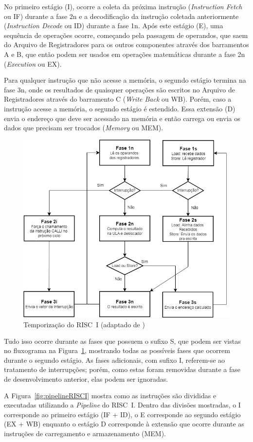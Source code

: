 \documentclass[
	12pt,				%
	openright,			%
	oneside,			%
	a4paper,			%
	english,			%
	french,				%
	spanish,			%
	brazil,				%
	]{abntex2}
\begin{document}
No primeiro estágio (I), ocorre a coleta da próxima instrução (\textit{Instruction Fetch} ou IF) durante a fase 2n e a decodificação da instrução coletada anteriormente (\textit{Instruction Decode} ou ID) durante a fase 1n. Após este estágio (E), uma sequência de operações ocorre, começando pela passagem de operandos, que saem do Arquivo de Registradores para os outros componentes através dos barramentos A e B, que então podem ser usados em operações matemáticas durante a fase 2n (\textit{Execution} ou EX).

Para qualquer instrução que não acesse a memória, o segundo estágio termina na fase 3n, onde os resultados de quaisquer operações são escritos no Arquivo de Registradores através do barramento C (\textit{Write Back} ou WB). Porém, caso a instrução acesse a memória, o segundo estágio é estendido. Essa extensão (D) envia o endereço que deve ser acessado na memória e então carrega ou envia os dados que precisam ser trocados (\textit{Memory} ou MEM).

\begin{figure}[h]
    \centering
    \includegraphics[width=0.5\linewidth]{ProcessoDesenvolvimento/Arquitetura/temporizacao_RISC-I.png}
    \caption{Temporização do RISC~I (adaptado de )}
    \label{fig:temporizationDiagram}
\end{figure}

Tudo isso ocorre durante as fases que possuem o sufixo S, que podem ser vistas no fluxograma na Figura~\ref{fig:temporizationDiagram}, mostrando todas as possíveis fases que ocorrem durante o segundo estágio. As fases adicionais, com sufixo I, referem-se ao tratamento de interrupções; porém, como estas foram removidas durante a fase de desenvolvimento anterior, elas podem ser ignoradas.

A Figura~\ref{fig:pipelineRISCI} mostra como as instruções são divididas e executadas utilizando a \textit{Pipeline} do RISC~I. Dentro das divisões mostradas, o I corresponde ao primeiro estágio (IF + ID), o E corresponde ao segundo estágio (EX + WB) enquanto o estágio D corresponde à extensão que ocorre durante as instruções de carregamento e armazenamento (MEM).
\end{document}
